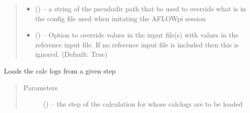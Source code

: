 \documentclass[letterpaper,10pt,english]{sphinxmanual}
\begin{document}
\begin{fulllineitems}
\begin{fulllineitems}
\begin{quote}
\begin{description}
\begin{itemize}
\item {} 
 () -- a string of the pseudodir path that be used to override what is in
the config file used when initating the AFLOWpi session

\item {} 
 () -- Option to override values in the input file(s) with values in the reference
input file. If no reference input file is included then this is ignored.
(Default: True)

\end{itemize}

\end{description}\end{quote}

\end{fulllineitems}


\begin{fulllineitems}
\label{\detokenize{prep:prep.init.items}}
\end{fulllineitems}


\begin{fulllineitems}
\label{\detokenize{prep:prep.init.iteritems}}
\end{fulllineitems}


\begin{fulllineitems}
\label{\detokenize{prep:prep.init.keys}}
\end{fulllineitems}


\begin{fulllineitems}
\label{\detokenize{prep:prep.init.load}}
Loads the calc logs from a given step
\begin{quote}\begin{description}
\item[{Parameters}] \leavevmode
{} () -- the step of the calculation for whose calclogs are to be loaded


\end{description}
\end{quote}
\end{fulllineitems}
\end{fulllineitems}
\end{document}

